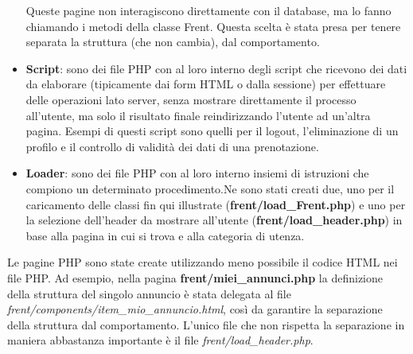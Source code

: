 \documentclass[1_relazione.tex]{subfiles}
\begin{document}
\begin{itemize}
    Queste pagine non interagiscono direttamente con il database, ma lo fanno chiamando i metodi della classe Frent.
    Questa scelta \`{e} stata presa per tenere separata la struttura (che non cambia), dal comportamento.
    \item \textbf{Script}: sono dei file PHP con al loro interno degli script che ricevono dei dati da elaborare (tipicamente dai form HTML o dalla sessione) per effettuare delle operazioni lato server, senza mostrare direttamente il processo all'utente, ma solo il risultato finale reindirizzando l'utente ad un'altra pagina.
    Esempi di questi script sono quelli per il logout, l'eliminazione di un profilo e il controllo di validità dei dati di una prenotazione.
    \item \textbf{Loader}: sono dei file PHP con al loro interno insiemi di istruzioni che compiono un determinato procedimento.\newline Ne sono stati creati due, uno per il caricamento delle classi fin qui illustrate (\textbf{frent/load\_Frent.php}) e uno per la selezione dell'header da mostrare all'utente (\textbf{frent/load\_header.php}) in base alla pagina in cui si trova e alla categoria di utenza.
\end{itemize}
Le pagine PHP sono state create utilizzando meno possibile il codice HTML nei file PHP.
Ad esempio, nella pagina \textbf{frent/miei\_annunci.php} la definizione della struttura del singolo annuncio \`{e} stata delegata al file \textit{frent/components/item\_mio\_annuncio.html}, così da garantire la separazione della struttura dal comportamento.
L'unico file che non rispetta la separazione in maniera abbastanza importante è il file \textit{frent/load\_header.php}.\\
\end{document}
